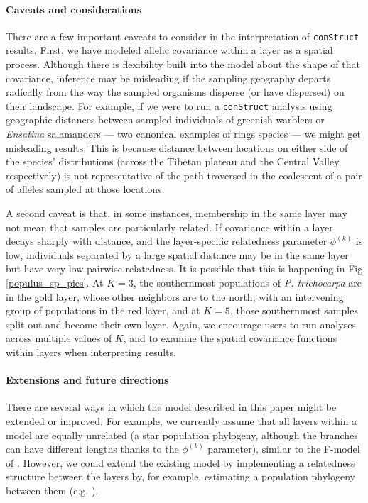 \documentclass[10pt,letterpaper]{article}
\begin{document}
\paragraph{Caveats and considerations}
There are a few important caveats to consider in the interpretation of \texttt{conStruct} results. 
First, we have modeled allelic covariance within a layer as a spatial process.
Although there is flexibility built into the model about the shape of that covariance, 
inference may be misleading if the sampling geography departs radically from the way 
the sampled organisms disperse (or have dispersed) on their landscape.
For example, if we were to run a \texttt{conStruct} analysis using geographic distances between 
sampled individuals of greenish warblers \cite{Irwin2001} or \textit{Ensatina} salamanders \cite{wake_schneider1998} 
--- two canonical examples of rings species --- 
we might get misleading results.
This is because distance between locations on either side of the species' distributions
(across the Tibetan plateau and the Central Valley, respectively) 
is not representative of the path traversed in the coalescent of a pair of alleles sampled at those locations.

A second caveat is that, in some instances, 
membership in the same layer may not mean that samples are particularly related.
If covariance within a layer decays sharply with distance, 
and the layer-specific relatedness parameter $\phi^{(k)}$ is low, 
individuals separated by a large spatial distance may be in the same layer but have very low pairwise relatedness.
It is possible that this is happening in Fig \ref{populus_sp_pies}. 
At $K=3$, the southernmost populations of \textit{P. trichocarpa} are in the gold layer, 
whose other neighbors are to the north, with an intervening group of populations in the red layer, 
and at $K=5$, those southernmost samples split out and become their own layer.
Again, we encourage users to run analyses across multiple values of $K$, 
and to examine the spatial covariance functions within layers when interpreting results.

\paragraph{Extensions and future directions}
There are several ways in which the model described in this paper might be extended or improved.  
For example, we currently assume that all layers within a model are equally unrelated 
(a star population phylogeny, although the branches can have different lengths thanks to the $\phi^{(k)}$ parameter), 
similar to the F-model of \cite{falush2003}.
However, we could extend the existing model by implementing 
a relatedness structure between the layers by, for example, 
estimating a population phylogeny between them
(e.g, \cite{treemix}).
\end{document}
